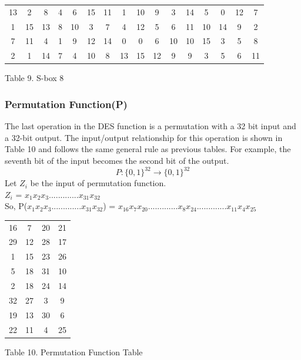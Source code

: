 \documentclass[11pt]{article}
\begin{document}
\begin{center}
\begin{tabular}{ | c | c | c | c | c | c | c | c | c | c | c | c | c | c | c | c |}
  \hline
    13&	2& 8& 4& 6& 15& 11&	1& 10& 9& 3& 14& 5&	0& 12& 7\\
    1&	15& 13& 8& 10& 3& 7& 4&	12& 5& 6& 11& 10& 14& 9& 2\\
    7&	11& 4& 1& 9& 12& 14& 0& 0& 6& 10& 10& 15& 3& 5& 8\\
    2&	1& 14& 7& 4& 10& 8& 13&	15& 12& 9& 9& 3& 5&	6& 11\\
  \hline
\end{tabular}
\end{center}
\begin{center}
Table 9. S-box 8
\end{center}

\subsubsection*{Permutation Function(P)}
The last operation in the DES function is a permutation with a 32 bit input and a 32-bit output. The input/output relationship for this operation is shown in Table 10 and follows the same general rule as previous tables. For example, the seventh bit of the input becomes the second bit of the output.
\[ P : \{0, 1\}^{32} \to \{0, 1\}^{32} \]
Let $Z_{i}$ be the input of permutation function. \\
\hspace{3cm} $Z_i$ = $x_1$$x_2$$x_3$.............$x_{31}$$x_{32}$ \\
So, \hspace{1cm} P($x_1$$x_2$$x_3$.............$x_{31}$$x_{32}$) = $x_{16}$$x_7$$x_{20}$.............$x_8$$x_{24}$.............$x_{11}$$x_4$$x_{25}$ 
\\
\begin{center}
\begin{tabular}{ | c | c | c | c |}
  \hline
    16&	7&	20&	21\\
    29&	12&	28&	17\\
    1& 15& 23& 26\\
    5&	18&	31&	10\\
    2&	18&	24&	14\\
    32&	27&	3&	9\\
    19&	13&	30&	6\\
    22&	11&	4&	25\\
  \hline
\end{tabular}
\end{center}
\begin{center}
Table 10. Permutation Function Table
\end{center}
\end{document}
